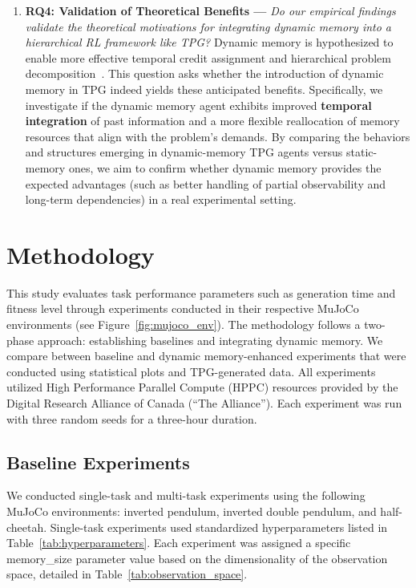 \documentclass[sigconf]{acmart}
\begin{document}
\begin{enumerate}
    \item \textbf{RQ4: Validation of Theoretical Benefits ---} \textit{Do our empirical findings validate the theoretical motivations for integrating dynamic memory into a hierarchical RL framework like TPG?} Dynamic memory is hypothesized to enable more effective temporal credit assignment and hierarchical problem decomposition~\cite{Kelly21TELO}. This question asks whether the introduction of dynamic memory in TPG indeed yields these anticipated benefits. Specifically, we investigate if the dynamic memory agent exhibits improved \textbf{temporal integration} of past information and a more flexible reallocation of memory resources that align with the problem's demands. By comparing the behaviors and structures emerging in dynamic-memory TPG agents versus static-memory ones, we aim to confirm whether dynamic memory provides the expected advantages (such as better handling of partial observability and long-term dependencies) in a real experimental setting.
\end{enumerate}

\section{Methodology}

This study evaluates task performance parameters such as generation time and 
fitness level through experiments conducted in their respective MuJoCo environments 
(see Figure~\ref{fig:mujoco_env}). The methodology follows a two-phase approach: establishing baselines
and integrating dynamic memory. We compare between baseline and dynamic memory-enhanced
experiments that were conducted using statistical plots and TPG-generated data. All
experiments utilized High Performance Parallel Compute (HPPC) resources provided by the
Digital Research Alliance of Canada (“The Alliance”). Each experiment was run with three
random seeds for a three-hour duration.

\subsection{Baseline Experiments}
We conducted single-task and multi-task experiments using the following MuJoCo environments:
inverted pendulum, inverted double pendulum, and half-cheetah. Single-task experiments used standardized
hyperparameters listed in Table~\ref{tab:hyperparameters}. Each experiment was assigned a specific memory\_size 
parameter value based on the dimensionality of the observation space, detailed in Table~\ref{tab:observation_space}.
\end{document}
